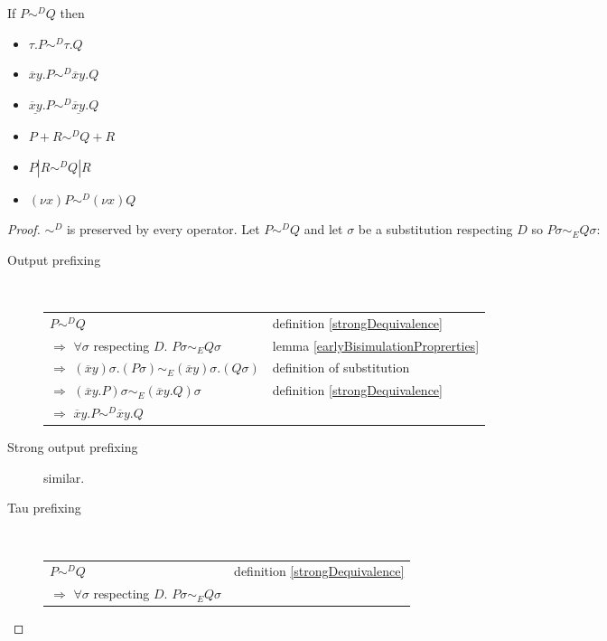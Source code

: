 \begin{lemma}\label{stringDEquivalencePreservedByAllExceptInput}
      If $P \sim^{D} Q$ then 
      \begin{itemize}
	\item 
	  $\tau.P \sim^{D} \tau.Q$
	\item 
	  $\overline{x}y.P \sim^{D} \overline{x}y.Q$
	\item 
	  $\underline{\overline{x}y}.P \sim^{D} \underline{\overline{x}y}.Q$
	\item
	  $P+R \sim^{D} Q+R$
	\item
	  $P|R \sim^{D} Q|R$
	\item
	  $(\nu x)P \sim^{D} (\nu x)Q$
      \end{itemize}
  \begin{proof}
    $\sim^{D}$ is preserved by every operator. Let $P \sim^{D} Q$ and let $\sigma$ be a substitution respecting $D$ so $P\sigma \sim_{E} Q\sigma$:
    \begin{description}
      \item[Output prefixing]\hfill \\
	\begin{center}
	  \begin{tabular}{ll}
	      $P \sim^{D} Q$
	    &
	      definition \ref{strongDequivalence}
	  \\
	      $\Rightarrow$ $\forall \sigma$ respecting $D.$ $P\sigma \sim_{E} Q\sigma$
	    &
	      lemma \ref{earlyBisimulationProprerties}
	  \\
	      $\Rightarrow$ $(\overline{x}y)\sigma.(P\sigma) \sim_{E} (\overline{x}y)\sigma.(Q\sigma)$
	    &
	      definition of substitution
	  \\
	      $\Rightarrow$ $(\overline{x}y.P)\sigma \sim_{E} (\overline{x}y.Q)\sigma$
	    &
	      definition \ref{strongDequivalence}
	  \\
	      $\Rightarrow$ $\overline{x}y.P \sim^{D} \overline{x}y.Q$
	    &
	  \end{tabular}
	\end{center}
      \item[Strong output prefixing] similar.
      \item[Tau prefixing]\hfill \\
	\begin{center}
	  \begin{tabular}{ll}
	      $P \sim^{D} Q$
	    &
	      definition \ref{strongDequivalence}
	  \\
	      $\Rightarrow$ $\forall \sigma$ respecting $D.$ $P\sigma \sim_{E} Q\sigma$

\end{tabular}
\end{center}
\end{description}
\end{proof}
\end{lemma}
